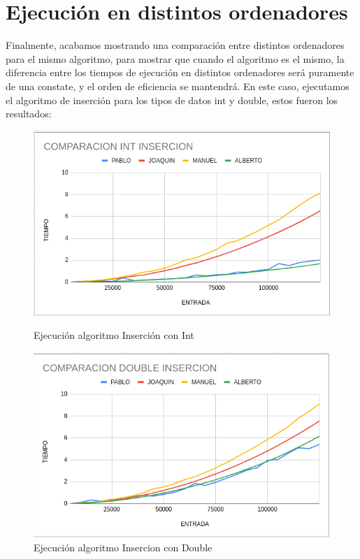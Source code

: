 \documentclass[11pt,openany]{book}
\begin{document}
\section{Ejecución en distintos ordenadores}
Finalmente, acabamos mostrando una comparación entre distintos ordenadores para el mismo algoritmo, para mostrar que cuando
el algoritmo es el mismo, la diferencia entre los tiempos de ejecución en distintos ordenadores será puramente de una constate,
y el orden de eficiencia se mantendrá. En este caso, ejecutamos el algoritmo de inserción para los tipos de datos int y double, estos
fueron los resultados:
\begin{figure}[H]
    \begin{minipage}{0.5\textwidth}
        \centering
        \includegraphics[width=\linewidth]{assets/Img/insercionordenadores.png}
        \caption{Ejecución algoritmo Inserción con Int}
        \label{fig:fibonacci}
    \end{minipage}
    \begin{minipage}{0.5\textwidth}
        \centering
        \includegraphics[width=\linewidth]{assets/Img/insercionordenadoresd.png}
        \caption{Ejecución algoritmo Insercion con Double}
    \end{minipage}
\end{figure}
\end{document}
